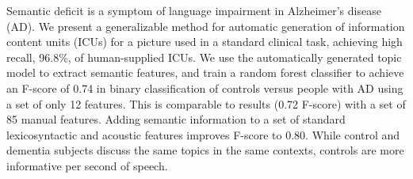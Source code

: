 Semantic deficit is a symptom of language impairment in Alzheimer's disease (AD). We present a generalizable method for automatic generation of information content units (ICUs) for a picture used in a standard clinical task, achieving high recall, 96.8\%, of human-supplied ICUs. We use the automatically generated topic model to extract semantic features, and train a random forest classifier to achieve an F-score of 0.74 in binary classification of controls versus people with AD using a set of only 12 features. This is comparable to results (0.72 F-score) with a set of 85 manual features. Adding semantic information to a set of standard lexicosyntactic and acoustic features improves F-score to 0.80. While control and dementia subjects discuss the same topics in the same contexts, controls are more informative per second of speech.
